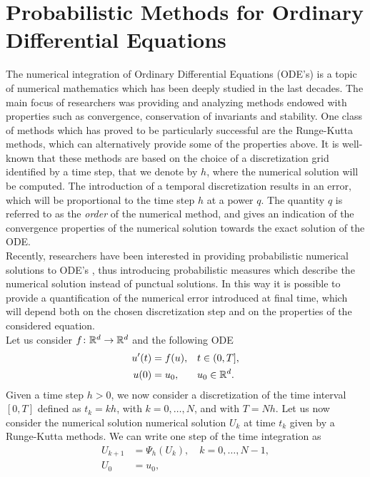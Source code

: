 \section{Probabilistic Methods for Ordinary Differential Equations}

The numerical integration of Ordinary Differential Equations (ODE's) is a topic of numerical mathematics which has been deeply studied in the last decades. The main focus of researchers was providing and analyzing methods endowed with properties such as convergence, conservation of invariants and stability. One class of methods which has proved to be particularly successful are the Runge-Kutta methods, which can alternatively provide some of the properties above. It is well-known that these methods are based on the choice of a discretization grid identified by a time step, that we denote by $h$, where the numerical solution will be computed. The introduction of a temporal discretization results in an error, which will be proportional to the time step $h$ at a power $q$. The quantity $q$ is referred to as the \textit{order} of the numerical method, and gives an indication of the convergence properties of the numerical solution towards the exact solution of the ODE. \\
Recently, researchers have been interested in providing probabilistic numerical solutions to ODE's \cite{CGS16}, thus introducing probabilistic measures which describe the numerical solution instead of punctual solutions. In this way it is possible to provide a quantification of the numerical error introduced at final time, which will depend both on the chosen discretization step and on the properties of the considered equation. \\
Let us consider $f\colon \mathbb{R}^d \to \mathbb{R}^d$ and the following ODE
\begin{equation}\label{eq:ODE}
\begin{aligned}
	u'(t) &= f(u), &&  t \in (0, T], \\
	u(0)  &= u_0, && u_0 \in \mathbb{R}^d.
\end{aligned}
\end{equation}
Given a time step $h >0$, we now consider a discretization of the time interval $[0, T]$ defined as $t_k = kh$, with $k = 0, \ldots, N$, and with $T = Nh$. Let us now consider the numerical solution numerical solution $U_k$ at time $t_k$ given by a Runge-Kutta methods. We can write one step of the time integration as 
\begin{equation}\label{numericalODE}
\begin{aligned}
	U_{k+1} &= \Psi_h(U_k), \quad k = 0, \ldots, N-1, \\
	U_{0} &= u_0, 
\end{aligned}
\end{equation}
